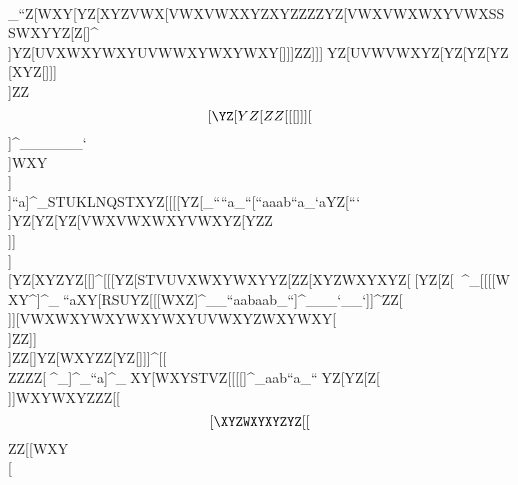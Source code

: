                                                             \\\_``Z[\UVXYZ[\]^UWXSTV_``^__WXZZ[\                                                            ^^^\\]WXY[\]YZ[XYZVWX[\]VWXVWXXYZXYZ                                                            ZZZYZ[VWXVWXWXYVWXSSSWXYYZ[Z[\ZZ[_``                                                            ^^^]]^\\]YZ[UVXWXYWXYUVWWXYWXYWXY[\]                                                            ]]]ZZ\YZ[XYZXYZZZ[[\][\][\][\]YZ[[\]                                                            ]]]]^^\\]YZ[UVWVWXYZ[YZ[YZ[YZ[XYZ[\]                                                            ]]]\\]ZZ\[[\YZ[YZ[ZZ[[[\\]]\\][\]]^_                                                            _____`\\]WXY\\]\\]``a]^_STUKLNQSTXYZ                                                            [[[[\]YZ[_````a_``[\]``aaab``a_`aYZ[                                                            ```^^_\\]YZ[YZ[YZ[VWXVWXWXYVWXYZ[YZZ                                                            \\\YZ[WXYUVXWXYUVWRRRVWXYZ[[\]Z[\_``                                                            [[[YZ[WXYUVWWXYXYZWXYUVXWXYWXYXYZ[\]                                                            ]]]\\][\]YZ[XYZYZ[[\][\]Z[\[\]ZZ[]]^                                                            [[[YZ[STVUVXWXYWXYYZ[ZZ[XYZWXYXYZ[\]                                                            ^^^[\]YZ[Z[\Z[\YZ[XYZYZ[YZ[]^^]^^]^_                                                            [[[[\]WXY\]^]^_^^_``aXY[RSUYZ\XYZXYZ                                                            [[[WXZ]^__``aabaab_``]^___`__`]]^ZZ[                                                            \\\YZ[WXYXYZYZ[YZ[Z[\[\]YZ[YZ[XYZWXY                                                            \\\YZ[VWXWXYUVXWXYRRRVWXXYZ[\]UVX__`                                                            ]]][\]VWXWXYWXYWXYWXYUVWXYZWXYWXY[\]                                                            ^^^\\]ZZ\ZZ\YZ[[\]YZ[YZ[YZ[[\]WXYZ[\                                                            [[[Z[\WXYUVXXYZXYZYZ[XYZXYZXYZYZ[Z[\                                                            ]]]\\]ZZ[\]]YZ[WXYZZ[YZ[\]]]]^[[\[\]                                                            ZZZZ[\]^^^^_]^_``a]^_^^_XY[WXYSTVZ[\                                                            [[[]^_aab``a_``^^_YZ[YZ[Z[\\]]WXYWXY                                                            ZZZ[[\[[\XYZWXYXYZYZ[[\]ZZ\Z[\YZ[WXY                                                            \\\YZ[
